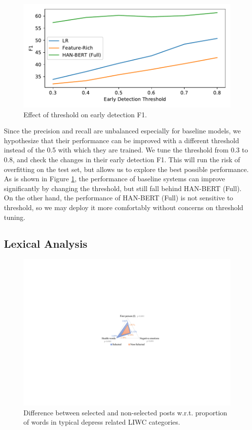 \begin{figure}[h]
    \centering
    \includegraphics[width=0.88\columnwidth]{figures/thr2early_f1.pdf}
    \caption{Effect of threshold on early detection F1.}
    \label{fig:thr2early_f1}
\end{figure}

Since the precision and recall are unbalanced especially for baseline models, we hypothesize that their performance can be improved with a different threshold instead of the 0.5 with which they are trained. We tune the threshold from 0.3 to 0.8, and check the changes in their early detection F1. This will run the risk of overfitting on the test set, but allows us to explore the best possible performance. As is shown in Figure \ref{fig:thr2early_f1}, the performance of baseline systems can improve significantly by changing the threshold, but still fall behind HAN-BERT (Full). On the other hand, the performance of HAN-BERT (Full) is not sensitive to threshold, so we may deploy it more comfortably without concerns on threshold tuning.

\subsection{Lexical Analysis}

\begin{figure}[h]
    \centering
    \includegraphics[width=0.88\columnwidth]{figures/lexical.pdf}
    \caption{Difference between selected and non-selected posts w.r.t. proportion of words in typical depress related LIWC categories.}
    \label{fig:lexical}
\end{figure}

